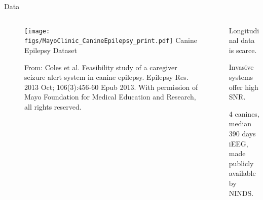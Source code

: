 \documentclass[t]{beamer}
\theoremstyle{definition}
\def\baselineskip{}%
\begin{document}
\begin{frame}{Data}
    \begin{columns}[T]
        \begin{column}{0.618 \textwidth}
        \vspace{-\baselineskip}
            \begin{figure}
                \centering
                \texttt{[image: figs/MayoClinic\_CanineEpilepsy\_print.pdf]}
                \large Canine Epilepsy Dataset
                \caption{From: Coles et al. Feasibility study of a caregiver seizure alert system in canine epilepsy. Epilepsy Res. 2013 Oct; 106(3):456-60 Epub 2013. With permission of Mayo Foundation for Medical Education and Research, all rights reserved.}
                \label{fig:data}
            \end{figure}
        \end{column}
        \begin{column}{0.382 \textwidth}
            \begin{block}{}
                Longitudinal data is scarce.
            \end{block}
            \begin{block}{}
                 Invasive systems offer high SNR. 
            \end{block}
            \begin{block}{}
                 4 canines,\\median 390 days iEEG,\\made publicly available by NINDS. 
            \end{block}
        \end{column}
    \end{columns}

\end{frame}

\end{document}
